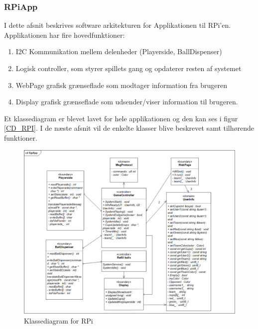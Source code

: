 \documentclass[Arkitektur/System_main.tex]{subfiles}
\begin{document}
\subsubsection{RPiApp}
I dette afsnit beskrives software arkitekturen for Applikationen til RPi'en. Applikationen har fire hovedfunktioner:
\begin{enumerate}
    \item I2C Kommunikation mellem delenheder (Playerside, BallDispenser)
    \item Logisk controller, som styrer spillets gang og opdaterer resten af systemet
    \item WebPage grafisk grænseflade som modtager information fra brugeren
    \item Display grafisk grænseflade som udsender/viser information til brugeren. 
\end{enumerate}
Et klassediagram er blevet lavet for hele applikationen og den kan ses i figur \ref{CD_RPI}. I de næste afsnit vil de enkelte klasser blive beskrevet samt tilhørende funktioner. 
\begin{figure}[H]
    \centering
    \includegraphics[width=\textwidth]{Arkitektur/Softwarearkitektur/Applikationsmodel/RPi/graphics_RPi/Class.png}
    \caption{Klassediagram for RPi}
    \label{fig:CD_RPI}
\end{figure}
\end{document}

